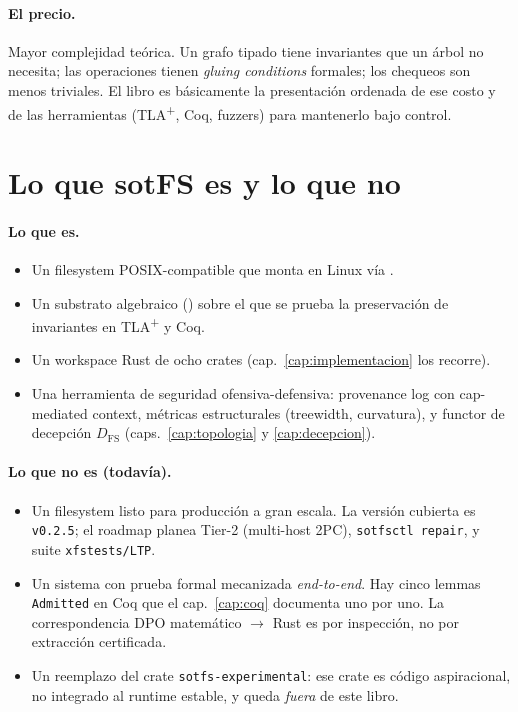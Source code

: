 \paragraph{El precio.} Mayor complejidad teórica. Un grafo tipado tiene
invariantes que un árbol no necesita; las operaciones tienen
\emph{gluing conditions} formales; los chequeos son menos triviales. El
libro es básicamente la presentación ordenada de ese costo y de las
herramientas (TLA\textsuperscript{+}, Coq, fuzzers) para mantenerlo bajo
control.

\section{Lo que sotFS es y lo que no}

\paragraph{Lo que es.}
\begin{itemize}
  \item Un filesystem POSIX-compatible que monta en Linux vía \fuse{}.
  \item Un substrato algebraico (\TGraph) sobre el que se prueba la
    preservación de invariantes en TLA\textsuperscript{+} y Coq.
  \item Un workspace Rust de ocho crates (cap.~\ref{cap:implementacion}
    los recorre).
  \item Una herramienta de seguridad ofensiva-defensiva: provenance
    log con cap-mediated context, métricas estructurales (treewidth,
    curvatura), y functor de decepción $D_{\mathrm{FS}}$
    (caps.~\ref{cap:topologia} y \ref{cap:decepcion}).
\end{itemize}

\paragraph{Lo que no es (todavía).}
\begin{itemize}
  \item Un filesystem listo para producción a gran escala. La versión
    cubierta es \texttt{v0.2.5}; el roadmap planea Tier-2 (multi-host
    2PC), \texttt{sotfsctl repair}, y suite \texttt{xfstests/LTP}.
  \item Un sistema con prueba formal mecanizada \emph{end-to-end}. Hay
    cinco lemmas \texttt{Admitted} en Coq que el cap.~\ref{cap:coq}
    documenta uno por uno. La correspondencia DPO matemático $\to$ Rust
    es por inspección, no por extracción certificada.
  \item Un reemplazo del crate \texttt{sotfs-experimental}: ese crate
    es código aspiracional, no integrado al runtime estable, y queda
    \emph{fuera} de este libro.
\end{itemize}

